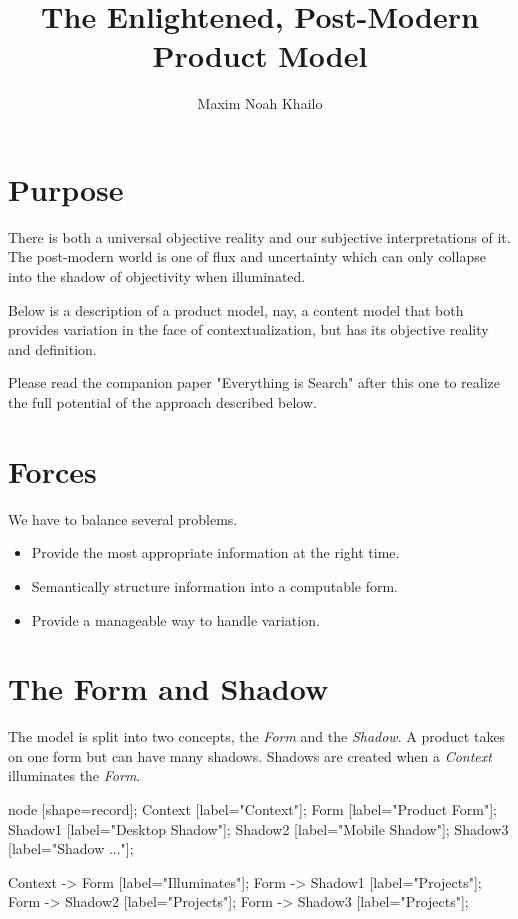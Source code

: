 \documentclass[11pt]{article}
\title{The Enlightened, Post-Modern Product Model}
\author{Maxim Noah Khailo}
\begin{document}
\maketitle
\section{Purpose}

There is both a universal objective reality and our subjective interpretations of 
it. The post-modern world is one of flux and uncertainty which can only collapse
into the shadow of objectivity when illuminated. 

Below is a description of a product model, nay, a content model that both provides
variation in the face of contextualization, but has its objective reality and definition.

Please read the companion paper "Everything is Search" after this one to realize
the full potential of the approach described below.

\section{Forces}

We have to balance several problems.

\begin{itemize}
    \item Provide the most appropriate information at the right time.
    \item Semantically structure information into a computable form.
    \item Provide a manageable way to handle variation.
\end{itemize}

\newpage
\section{The Form and Shadow}

The model is split into two concepts, the \emph{Form} and the \emph{Shadow}. 
A product takes on one form but can have many shadows. Shadows are created when
a \emph{Context} illuminates the \emph{Form}.

 {
    node [shape=record];
    Context [label="Context"];
    Form [label="Product Form"];
    Shadow1 [label="Desktop Shadow"];
    Shadow2 [label="Mobile Shadow"];
    Shadow3 [label="Shadow ..."];

    Context -> Form [label="Illuminates"];
    Form -> Shadow1 [label="Projects"];
    Form -> Shadow2 [label="Projects"];
    Form -> Shadow3 [label="Projects"];
}
\end{document}
